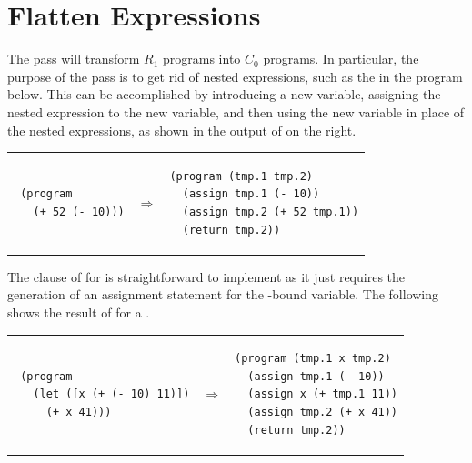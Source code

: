 \documentclass[11pt]{book}
\begin{document}
\section{Flatten Expressions}
\label{sec:flatten-r1}

The  pass will transform $R_1$ programs into $C_0$
programs. In particular, the purpose of the  pass is to
get rid of nested expressions, such as the  in the program
below. This can be accomplished by introducing a new variable,
assigning the nested expression to the new variable, and then using
the new variable in place of the nested expressions, as shown in the
output of  on the right.\\
\begin{tabular}{lll}
\begin{minipage}{0.4\textwidth}
\begin{lstlisting}
 (program
   (+ 52 (- 10)))
\end{lstlisting}
\end{minipage}
&
$\Rightarrow$
&
\begin{minipage}{0.4\textwidth}
\begin{lstlisting}
(program (tmp.1 tmp.2)
  (assign tmp.1 (- 10))
  (assign tmp.2 (+ 52 tmp.1))
  (return tmp.2))
\end{lstlisting}
\end{minipage}
\end{tabular}

The clause of  for  is straightforward to
implement as it just requires the generation of an assignment
statement for the -bound variable. The following shows the
result of  for a . \\
\begin{tabular}{lll}
\begin{minipage}{0.4\textwidth}
\begin{lstlisting}
 (program
   (let ([x (+ (- 10) 11)])
     (+ x 41)))
\end{lstlisting}
\end{minipage}
&
$\Rightarrow$
&
\begin{minipage}{0.4\textwidth}
\begin{lstlisting}
(program (tmp.1 x tmp.2)
  (assign tmp.1 (- 10))
  (assign x (+ tmp.1 11))
  (assign tmp.2 (+ x 41))
  (return tmp.2))
\end{lstlisting}
\end{minipage}
\end{tabular}
\end{document}
